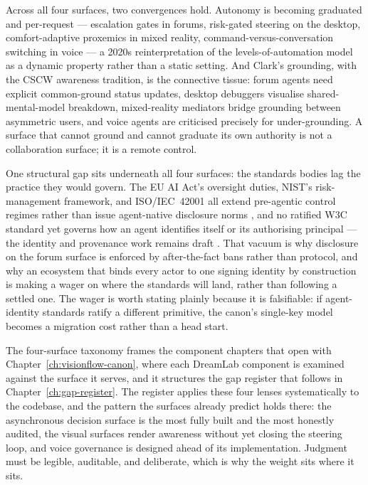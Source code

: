 \begin{keyinsight}[title={What Every Surface Shares}]
Across all four surfaces, two convergences hold. Autonomy is becoming graduated and per-request --- escalation gates in forums, risk-gated steering on the desktop, comfort-adaptive proxemics in mixed reality, command-versus-conversation switching in voice --- a 2020s reinterpretation of the levels-of-automation model as a dynamic property rather than a static setting. And Clark's grounding, with the CSCW awareness tradition, is the connective tissue: forum agents need explicit common-ground status updates, desktop debuggers visualise shared-mental-model breakdown, mixed-reality mediators bridge grounding between asymmetric users, and voice agents are criticised precisely for under-grounding. A surface that cannot ground and cannot graduate its own authority is not a collaboration surface; it is a remote control.
\end{keyinsight}

One structural gap sits underneath all four surfaces: the standards bodies lag the practice they would govern. The EU AI Act's oversight duties, NIST's risk-management framework, and ISO/IEC~42001 all extend pre-agentic control regimes rather than issue agent-native disclosure norms \parencite{EUAIAct2025, NISTAIRMF, ISO42001}, and no ratified W3C standard yet governs how an agent identifies itself or its authorising principal --- the identity and provenance work remains draft \parencite{AIIdentity2026, Souza2025ProvAgent}. That vacuum is why disclosure on the forum surface is enforced by after-the-fact bans rather than protocol, and why an ecosystem that binds every actor to one signing identity by construction is making a wager on where the standards will land, rather than following a settled one. The wager is worth stating plainly because it is falsifiable: if agent-identity standards ratify a different primitive, the canon's single-key model becomes a migration cost rather than a head start.

The four-surface taxonomy frames the component chapters that open with Chapter~\ref{ch:visionflow-canon}, where each DreamLab component is examined against the surface it serves, and it structures the gap register that follows in Chapter~\ref{ch:gap-register}. The register applies these four lenses systematically to the codebase, and the pattern the surfaces already predict holds there: the asynchronous decision surface is the most fully built and the most honestly audited, the visual surfaces render awareness without yet closing the steering loop, and voice governance is designed ahead of its implementation. Judgment must be legible, auditable, and deliberate, which is why the weight sits where it sits.

